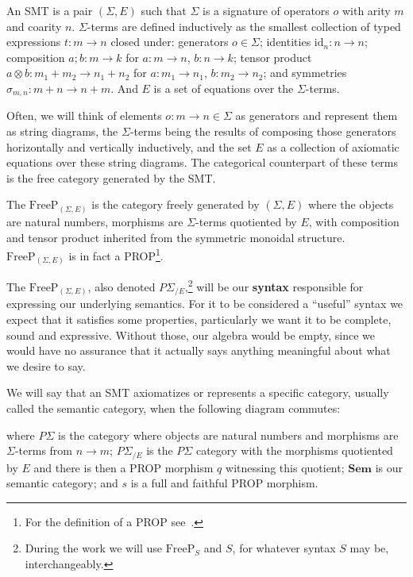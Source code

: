 \begin{definition}
	An SMT is a pair $(\Sigma,E)$ such that $\Sigma$ is a signature of operators $o$ with arity $m$ and coarity $n$.
	$\Sigma$-terms are defined inductively as the smallest collection of
	typed expressions $t : m \to n$ closed under: generators $o \in \Sigma$;
	identities $\mathrm{id}_n : n \to n$; composition $a;b : m\to k$ for $a:m\to n$, $b:n\to k$;
	tensor product $a \otimes b : m_1+m_2 \to n_1+n_2$ for $a:m_1\to n_1$, $b:m_2\to n_2$;
	and symmetries $\sigma_{m,n} : m+n \to n+m$.
	And $E$ is a set of equations over the $\Sigma$-terms.
\end{definition}

Often, we will think of elements $o:m\to n \in \Sigma$ as generators and represent them as string diagrams, the $\Sigma$-terms being the results of composing those generators horizontally and vertically inductively, and the set $E$ as a collection of axiomatic equations over these string diagrams. The categorical counterpart of these terms is the free category generated by the SMT.

\begin{definition}
	The $\text{FreeP}_{(\Sigma,E)}$ is the category freely generated by $(\Sigma,E)$ where the objects are natural numbers, morphisms are $\Sigma$-terms quotiented by $E$, with composition and tensor product inherited from the symmetric monoidal structure. $\text{FreeP}_{(\Sigma,E)}$ is in fact a PROP\footnote{For the definition of a PROP see~\cite{maclane1998categories}.}.
\end{definition}

The $\text{FreeP}_{(\Sigma,E)}$, also denoted $P\Sigma_{/E}$,\footnote{During the work we will use $\text{FreeP}_{S}$ and $S$, for whatever syntax $S$ may be, interchangeably.}
will be our \textbf{syntax} responsible for expressing our underlying semantics.
For it to be considered a ``useful'' syntax we expect that it satisfies some properties, particularly we want it to be complete, sound and expressive. Without those, our algebra would be empty, since we would have no assurance that it actually says anything meaningful about what we desire to say.

\begin{definition}\label{def:definability}
	We will say that an SMT axiomatizes or represents a specific category, usually called the semantic category, when the following diagram commutes:
	\begin{figure}[H]
		\centering
        
	\end{figure}
	where $P\Sigma$ is the category where objects are natural numbers and morphisms are $\Sigma$-terms from $n \to m$; $P\Sigma_{/E}$ is the $P\Sigma$ category with the morphisms quotiented by $E$ and there is then a PROP morphism $q$ witnessing this quotient; $\textbf{Sem}$ is our semantic category; and $s$ is a full and faithful PROP morphism.
\end{definition}


